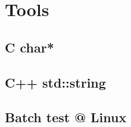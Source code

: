 \section{Tools}
	\subsection{C char*}
		
	\subsection{C++ std::string}
		
	\subsection{Batch test @ Linux}
		
